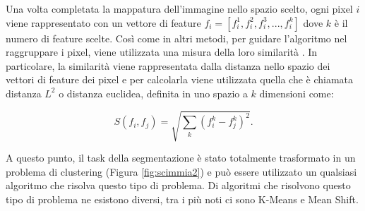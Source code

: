 Una volta completata la mappatura dell'immagine nello spazio scelto, ogni pixel $i$ viene rappresentato con un vettore di feature $f_{i}=[f_{i}^1, f_{i}^2, f_{i}^3, ..., f_{i}^k]$ dove $k$ è il numero di feature scelte. Così come in altri metodi, per guidare l'algoritmo nel raggruppare i pixel, viene utilizzata una misura della loro similarità . In particolare, la similarità viene rappresentata dalla distanza nello spazio dei vettori di feature dei pixel e per calcolarla viene utilizzata quella che è chiamata distanza $L^2$ o distanza euclidea, definita in uno spazio a $k$ dimensioni come:

\begin{equation}
    S(f_{i}, f_{j}) = \sqrt{\sum_{k}{(f_{i}^k-f_{j}^k)^2}}.
\end{equation}

A questo punto, il task della segmentazione è stato totalmente trasformato in un problema di clustering (Figura \ref{fig:scimmia2}) e può essere utilizzato un qualsiasi algoritmo che risolva questo tipo di problema. Di algoritmi che risolvono questo tipo di problema ne esistono diversi, tra i più noti ci sono K-Means e Mean Shift.


